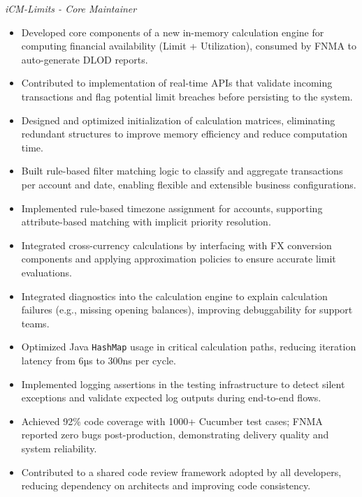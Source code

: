 \documentclass[a4paper,10pt]{article}
\newcommand{\cvHeaderThree}[1]{%
  \noindent\textit{#1}%
}
\newenvironment{cvItemList}{%
  \begin{itemize}%
    \setlength{\itemsep}{0.1em}%
    \setlength{\topsep}{0em}%
    \setlength{\partopsep}{0em}%
    \setlength{\parsep}{0em}%
    \setlength{\parskip}{0em}%
}{%
  \end{itemize}%
}
\begin{document}
\cvHeaderThree{iCM-Limits - Core Maintainer}
\begin{cvItemList}
  \item Developed core components of a new in-memory calculation engine for computing financial availability (Limit + Utilization), consumed by FNMA to auto-generate DLOD reports.
  \item Contributed to implementation of real-time APIs that validate incoming transactions and flag potential limit breaches before persisting to the system.
  \item Designed and optimized initialization of calculation matrices, eliminating redundant structures to improve memory efficiency and reduce computation time.
  \item Built rule-based filter matching logic to classify and aggregate transactions per account and date, enabling flexible and extensible business configurations.
  \item Implemented rule-based timezone assignment for accounts, supporting attribute-based matching with implicit priority resolution.
  \item Integrated cross-currency calculations by interfacing with FX conversion components and applying approximation policies to ensure accurate limit evaluations.
  \item Integrated diagnostics into the calculation engine to explain calculation failures (e.g., missing opening balances), improving debuggability for support teams.
  \item Optimized Java \texttt{HashMap} usage in critical calculation paths, reducing iteration latency from 6µs to 300ns per cycle.
  \item Implemented logging assertions in the testing infrastructure to detect silent exceptions and validate expected log outputs during end-to-end flows.
  \item Achieved 92\% code coverage with 1000+ Cucumber test cases; FNMA reported zero bugs post-production, demonstrating delivery quality and system reliability.
  \item Contributed to a shared code review framework adopted by all developers, reducing dependency on architects and improving code consistency.
\end{cvItemList}

\newpage
\end{document}
